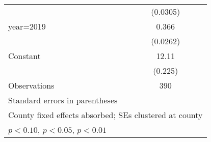 \begin{table}[htbp]
\begin{tabular}{l*{1}{c}}
                    &    (0.0305)         \\
[1em]
year=2019           &       0.366\sym{***}\\
                    &    (0.0262)         \\
[1em]
Constant            &       12.11\sym{***}\\
                    &     (0.225)         \\
\hline
Observations        &         390         \\
\hline\hline
\multicolumn{2}{l}{\footnotesize Standard errors in parentheses}\\
\multicolumn{2}{l}{\footnotesize County fixed effects absorbed; SEs clustered at county}\\
\multicolumn{2}{l}{\footnotesize \sym{*} \(p<0.10\), \sym{**} \(p<0.05\), \sym{***} \(p<0.01\)}\\
\end{tabular}
\end{table}
